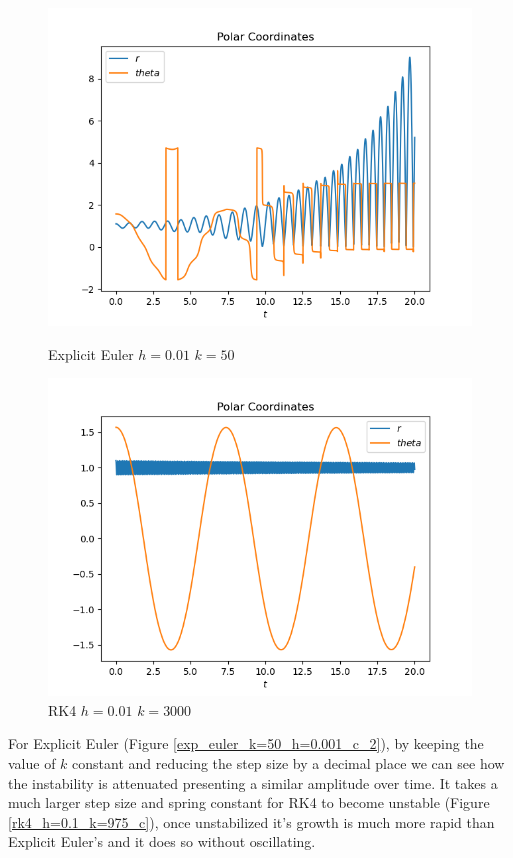 \documentclass{report}
\newcounter{constant}
\begin{document}
\begin{figure}[h]
\centering
\begin{minipage}[b]{0.45\textwidth}
\centering
\includegraphics[width=\textwidth]{../Plots/ExpEuler/exp_euler_k=50_h=0.01_c}
\caption{Explicit Euler $h=0.01$ $k=50$}
\label{exp_euler_k=50_h=0.01_c}
\end{minipage}
\hfill
\begin{minipage}[b]{0.45\textwidth}
\centering
\includegraphics[width=\textwidth]{../Plots/RK4/rk4_h=0.01_k=3000_c}
\caption{RK4 $h=0.01$ $k=3000$}
\label{rk4_h=0.01_k=3000_c}
\end{minipage}
\end{figure}
	
For Explicit Euler (Figure \ref{exp_euler_k=50_h=0.001_c_2}), by keeping the value of $k$ constant and reducing the step size by a decimal place we can see how the instability is attenuated presenting a similar amplitude over time.
It takes a much larger step size and spring constant for RK4 to become unstable (Figure \ref{rk4_h=0.1_k=975_c}), once unstabilized it’s growth is much more rapid than Explicit Euler’s and it does so without oscillating.
\end{document}
